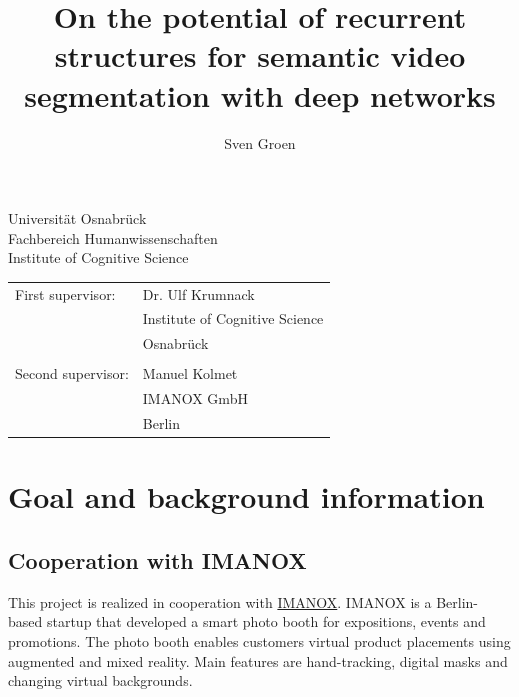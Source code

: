 \documentclass[11pt,
  paper=a4, 
  bibliography=totocnumbered,
	captions=tableheading,
	BCOR=10mm
]{scrreprt}
\title{On the potential of recurrent structures for semantic video segmentation with deep networks}
\author{Sven Groen}
\theoremstyle{definition}
\begin{document}
\begin{titlepage}
	\begin{flushleft}
		Universität Osnabrück\\
		Fachbereich Humanwissenschaften\\
		Institute of Cognitive Science
	\end{flushleft}

	\vspace{2cm}
	\vspace{1cm}

	\begin{tabular}{ll}
		First supervisor:  & Dr. Ulf Krumnack          \\
		                   & Institute of Cognitive Science            \\
		                   & Osnabrück                \\\\
		Second supervisor: & Manuel Kolmet         \\
		                   & IMANOX GmbH  \\
		                   & Berlin 
	\end{tabular}

\end{titlepage}


\pagebreak


\tableofcontents


\chapter{Goal and background information}

\section{Cooperation with IMANOX}
This project is realized in cooperation with \href{https://www.Imanox.de/}{IMANOX}. 
IMANOX is a Berlin-based startup that developed a smart photo booth for expositions, events and promotions. 
The photo booth enables customers virtual product placements using augmented and mixed reality. 
Main features are hand-tracking, digital masks and changing virtual backgrounds.
\end{document}

